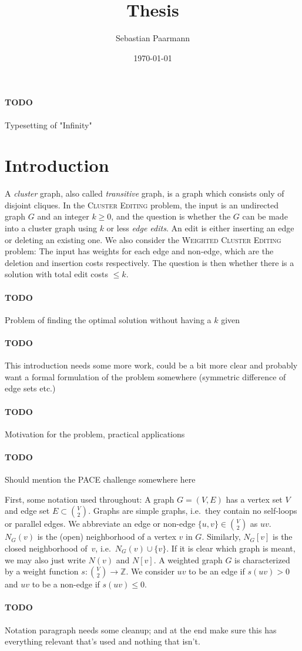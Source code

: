 \documentclass{article}
\title{Thesis}
\author{Sebastian Paarmann}
\date\today
\newcommand{\todo}[1]{\paragraph{TODO} #1}
\begin{document}
\maketitle

\tableofcontents

\todo Typesetting of "Infinity"

\section{Introduction}

A \emph{cluster} graph, also called \emph{transitive} graph, is a graph which consists only of
disjoint cliques.  In the \textsc{Cluster Editing} problem, the input is an undirected graph $G$ and
an integer $k \geq 0$, and the question is whether the $G$ can be made into a cluster graph using
$k$ or less \emph{edge edits}. An edit is either inserting an edge or deleting an existing one. We
also consider the \textsc{Weighted Cluster Editing} problem: The input has weights for each edge and
non-edge, which are the deletion and insertion costs respectively. The question is then whether
there is a solution with total edit costs $\leq k$.

\todo Problem of finding the optimal solution without having a $k$ given

\todo This introduction needs some more work, could be a bit more clear and probably want a
formal formulation of the problem somewhere (symmetric difference of edge sets etc.)

\todo Motivation for the problem, practical applications

\todo Should mention the PACE challenge somewhere here

First, some notation used throughout: A graph $G = (V, E)$ has a vertex set $V$ and edge set $E
\subset \binom{V}{2}$. Graphs are simple graphs, i.e.\ they contain no self-loops or parallel edges.
We abbreviate an edge or non-edge $\{u, v\} \in \binom{V}{2}$ as $uv$.  $N_G(v)$ is the (open)
neighborhood of a vertex $v$ in $G$. Similarly, $N_G[v]$ is the closed neighborhood of~$v$, i.e.\
$N_G(v) \cup \{v\}$. If it is clear which graph is meant, we may also just write $N(v)$ and $N[v]$.
A weighted graph $G$ is characterized by a weight function $s\colon \binom{V}{2} \to \mathbb{Z}$. We
consider $uv$ to be an edge if $s(uv) > 0$ and $uv$ to be a non-edge if $s(uv) \leq 0$.

\todo Notation paragraph needs some cleanup; and at the end make sure this has everything relevant
that's used and nothing that isn't.
\end{document}
